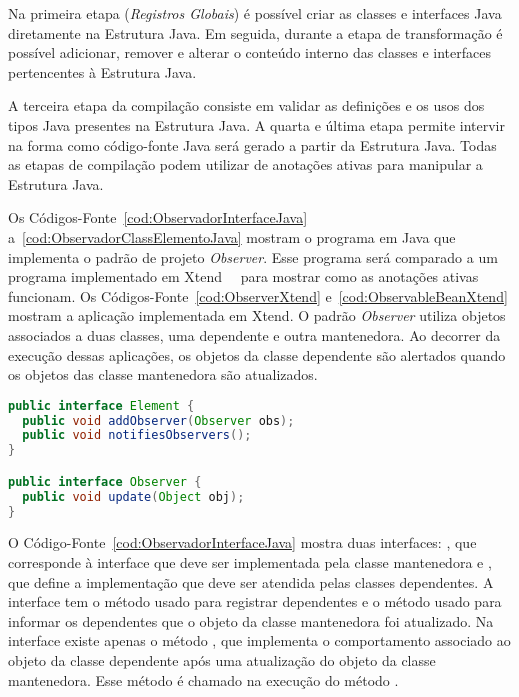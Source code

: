 Na primeira etapa (\textit{Registros Globais}) é possível criar as classes e interfaces Java diretamente na Estrutura Java. Em seguida, durante a etapa de transformação é possível adicionar, remover e alterar o conteúdo interno das classes e interfaces pertencentes à Estrutura Java.

A terceira etapa da compilação consiste em validar as definições e os usos dos tipos Java presentes na Estrutura Java. A quarta e última etapa permite intervir na forma como código-fonte Java será gerado a partir da Estrutura Java. Todas as etapas de compilação podem utilizar de anotações ativas para manipular a Estrutura Java.

Os Códigos-Fonte~\ref{cod:ObservadorInterfaceJava} a~\ref{cod:ObservadorClassElementoJava} mostram o programa em Java que implementa o padrão de projeto \textit{Observer}. Esse programa será comparado a um programa implementado em Xtend~\cite{blewitt2005automatic}~\cite{miao2014compile} para mostrar como as anotações ativas funcionam. Os Códigos-Fonte~\ref{cod:ObserverXtend} e~\ref{cod:ObservableBeanXtend} mostram a aplicação implementada em Xtend. O padrão \textit{Observer} utiliza objetos associados a duas classes, uma dependente e outra mantenedora. Ao decorrer da execução dessas aplicações, os objetos da classe dependente são alertados quando os objetos das classe mantenedora são atualizados.

\begin{lstlisting}[language=Java, caption={Interfaces usadas para implementar o padrão \textit{Observer} em Java}, label={cod:ObservadorInterfaceJava}]
public interface Element {
  public void addObserver(Observer obs);
  public void notifiesObservers();
}

public interface Observer {
  public void update(Object obj);
}
\end{lstlisting}

O Código-Fonte~\ref{cod:ObservadorInterfaceJava} mostra duas interfaces: , que corresponde à interface que deve ser implementada pela classe mantenedora e , que  define a implementação que deve ser atendida pelas classes dependentes. A interface  tem o método  usado para registrar dependentes e o método  usado para informar os dependentes que o objeto da classe mantenedora foi atualizado. Na interface  existe apenas o método , que implementa o comportamento associado ao objeto da classe dependente após uma atualização do objeto da classe mantenedora. Esse método é chamado na execução do método .


